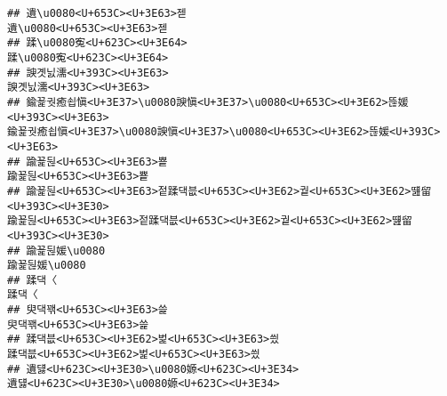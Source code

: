 \documentclass[]{article}
\begin{document}
\begin{verbatim}
## 遺\u0080<U+653C><U+3E63>젣                                                                                                                                                                                     遺\u0080<U+653C><U+3E63>젣
## 蹂\u0080寃<U+623C><U+3E64>                                                                                                                                                                                     蹂\u0080寃<U+623C><U+3E64>
## 諛곗닔濡<U+393C><U+3E63>                                                                                                                                                                                         諛곗닔濡<U+393C><U+3E63>
## 鍮꾩궛癒쇱愼<U+3E37>\u0080諛愼<U+3E37>\u0080<U+653C><U+3E62>뜮媛<U+393C><U+3E63>                                                                                                 鍮꾩궛癒쇱愼<U+3E37>\u0080諛愼<U+3E37>\u0080<U+653C><U+3E62>뜮媛<U+393C><U+3E63>
## 踰꾩뒪<U+653C><U+3E63>뿉                                                                                                                                                                                         踰꾩뒪<U+653C><U+3E63>뿉
## 踰꾩뒪<U+653C><U+3E63>젙蹂댁븞<U+653C><U+3E62>궡<U+653C><U+3E62>떒留<U+393C><U+3E30>                                                                                                     踰꾩뒪<U+653C><U+3E63>젙蹂댁븞<U+653C><U+3E62>궡<U+653C><U+3E62>떒留<U+393C><U+3E30>
## 踰꾩뒪媛\u0080                                                                                                                                                                                                 踰꾩뒪媛\u0080
## 蹂댁〈                                                                                                                                                                                                                 蹂댁〈
## 臾댁꽦<U+653C><U+3E63>쓽                                                                                                                                                                                         臾댁꽦<U+653C><U+3E63>쓽
## 蹂댁븞<U+653C><U+3E62>벑<U+653C><U+3E63>씠                                                                                                                                                                 蹂댁븞<U+653C><U+3E62>벑<U+653C><U+3E63>씠
## 遺덇<U+623C><U+3E30>\u0080嫄<U+623C><U+3E34>                                                                                                                                                             遺덇<U+623C><U+3E30>\u0080嫄<U+623C><U+3E34>

\end{verbatim}
\end{document}
